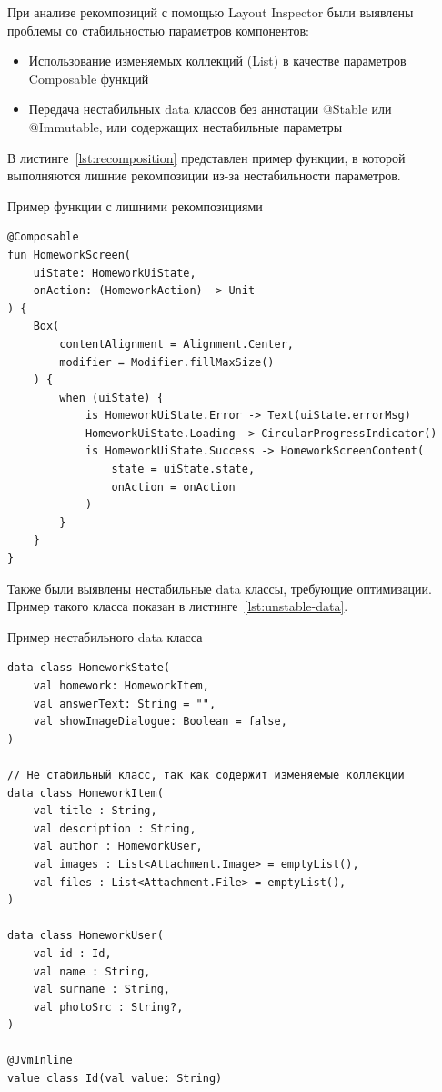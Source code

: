 \documentclass[14pt, russian]{scrartcl}
\begin{document}
При анализе рекомпозиций с помощью Layout Inspector были выявлены проблемы со стабильностью параметров компонентов:

\begin{itemize}
\item Использование изменяемых коллекций (List) в качестве параметров Composable функций
\item Передача нестабильных data классов без аннотации @Stable или @Immutable, или содержащих нестабильные параметры
\end{itemize}

В листинге~\ref{lst:recomposition} представлен пример функции, в которой выполняются лишние рекомпозиции из-за нестабильности параметров.

\begin{listing}[!htb]
\caption{Пример функции с лишними рекомпозициями}
\vspace{-0.3cm}
\label{lst:recomposition}
\begin{verbatim}
@Composable
fun HomeworkScreen(
    uiState: HomeworkUiState,
    onAction: (HomeworkAction) -> Unit
) {
    Box(
        contentAlignment = Alignment.Center,
        modifier = Modifier.fillMaxSize()
    ) {
        when (uiState) {
            is HomeworkUiState.Error -> Text(uiState.errorMsg)
            HomeworkUiState.Loading -> CircularProgressIndicator()
            is HomeworkUiState.Success -> HomeworkScreenContent(
                state = uiState.state,
                onAction = onAction
            )
        }
    }
}
\end{verbatim}
\end{listing}

Также были выявлены нестабильные data классы, требующие оптимизации. Пример такого класса показан в листинге~\ref{lst:unstable-data}.

\begin{listing}[!htb]
\caption{Пример нестабильного data класса}
\vspace{-0.3cm}
\label{lst:unstable-data}
\begin{verbatim}
data class HomeworkState(
    val homework: HomeworkItem,
    val answerText: String = "",
    val showImageDialogue: Boolean = false,
)

// Не стабильный класс, так как содержит изменяемые коллекции
data class HomeworkItem(
    val title : String,
    val description : String,
    val author : HomeworkUser,
    val images : List<Attachment.Image> = emptyList(),
    val files : List<Attachment.File> = emptyList(),
)

data class HomeworkUser(
    val id : Id,
    val name : String,
    val surname : String,
    val photoSrc : String?,
)

@JvmInline
value class Id(val value: String)
\end{verbatim}
\end{listing}
\end{document}
